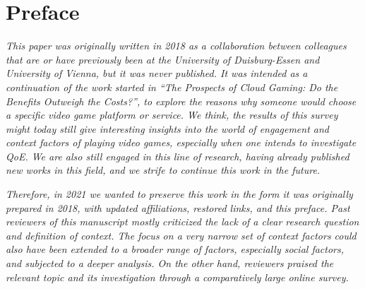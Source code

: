 \section*{Preface}


\textit{This paper was originally written in 2018 as a collaboration between colleagues that are or have previously been at the University of Duisburg-Essen and University of Vienna, but it was never published. It was intended as a continuation of the work started in ``The Prospects of Cloud Gaming: Do the Benefits Outweigh the Costs?'', to explore the reasons why someone would choose a specific video game platform or service.
We think, the results of this survey might today still give interesting insights into the world of engagement and context factors of playing video games, especially when one intends to investigate QoE. We are also still engaged in this line of research, having already published new works in this field, and we strife to continue this work in the future.} 

\textit{
Therefore, in 2021 we wanted to preserve this work in the form it was originally prepared in 2018, with updated affiliations, restored links, and this preface. 
Past reviewers of this manuscript mostly criticized the lack of a clear research question and definition of context. The focus on a very narrow set of context factors could also have been extended to a broader range of factors, especially social factors, and subjected to a deeper analysis. On the other hand, reviewers praised the relevant topic and its investigation through a comparatively large online survey.
}

